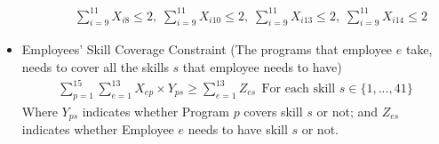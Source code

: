 \documentclass[12pt]{article}
\begin{document}
\begin{itemize}
\begin{itemize}
\begin{align*}
&\sum_{i = 9}^{11} X_{i8} \leq 2 \text{,} \ \
\sum_{i = 9}^{11} X_{i10} \leq 2 \text{,} \ \
\sum_{i = 9}^{11} X_{i13} \leq 2 \text{,} \ \
\sum_{i = 9}^{11} X_{i14} \leq 2
\end{align*}
\end{itemize}
\item Employees' Skill Coverage Constraint (The programs that employee $e$ take, needs to cover all the skills $s$ that employee needs to have)
\begin{align*}
    \sum_{p = 1}^{15} \sum_{e = 1}^{13} X_{ep} \times Y_{ps} \geq \sum_{e = 1}^{13} Z_{es} \ \ \text{For each skill } s \in \{1, ..., 41\}
\end{align*}
Where $Y_{ps}$ indicates whether Program $p$ covers skill $s$ or not; and $Z_{es}$ indicates whether Employee $e$ needs to have skill $s$ or not.

\end{itemize}
\end{document}
